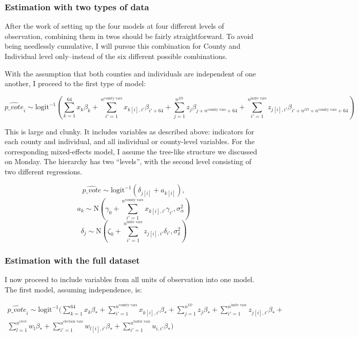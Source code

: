 \documentclass[12pt,twoside]{reedthesis}
\begin{document}
  \subsubsection{Estimation with two types of
  data}\label{estimation-with-two-types-of-data}
  
  After the work of setting up the four models at four different levels of
  observation, combining them in twos should be fairly straightforward. To
  avoid being needlessly cumulative, I will pursue this combination for
  County and Individual level only--instead of the six different possible
  combinations.
  
  With the assumption that both counties and individuals are independent
  of one another, I proceed to the first type of model:
  
  \[\hat{p\_vote}_i \sim \text{logit}^{-1}(\sum_{k = 1}^{64}x_{k}\beta_{k} + \sum_{i'=1}^{n^{\text{county vars}}}x_{k[i], i'}\beta_{i'+64} + \sum_{j = 1}^{n^{ID}}z_{j}\beta_{j + n^{\text{county vars}} + 64} + \sum_{i'=1}^{n^{\text{indiv vars}}}z_{j[i], i'}\beta_{i'+n^{ID} + n^{\text{county vars}} + 64})\]
  
  This is large and clunky. It includes variables as described above:
  indicators for each county and individual, and all individual or
  county-level variables. For the corresponding mixed-effects model, I
  assume the tree-like structure we discussed on Monday. The hierarchy has
  two ``levels'', with the second level consisting of two different
  regressions.
  
  \[\hat{p\_vote} \sim \text{logit}^{-1}(\delta_{j[i]} + a_{k[i]}), \]
  \[a_{k} \sim \text{N}(\gamma_0 + \sum_{i'=1}^{n^{\text{county vars}}}x_{k[i], i'}\gamma_{i'}, \sigma_{\alpha}^2)\]
  \[\delta_{j} \sim \text{N}(\zeta_0 + \sum_{i'=1}^{n^{\text{indiv vars}}}z_{j[i], i'}\delta_{i'}, \sigma_{\delta}^2)\]
  
  \subsubsection{Estimation with the full
  dataset}\label{estimation-with-the-full-dataset}
  
  I now proceed to include variables from all units of observation into
  one model. The first model, assuming independence, is:
  
  \[
  \begin{aligned}
  \hat{p\_vote}_i \sim \text{logit}^{-1}(\sum_{k = 1}^{64}x_{k}\beta_{*} + \sum_{i'=1}^{n^{\text{county vars}}}x_{k[i], i'}\beta_{*} + \sum_{j = 1}^{n^{ID}}z_{j}\beta_{*} + \sum_{i'=1}^{n^{\text{indiv vars}}}z_{j[i], i'}\beta_{*} + \\
  \sum_{l = 1}^{n^{elect}}w_{l}\beta_{*} + \sum_{i'=1}^{n^{\text{election vars}}}w_{l[i], i'}\beta_{*} + \sum_{i' = 1}^{n^{\text{ballot vars}}}u_{i,i'}\beta_{*})
  \end{aligned}
  \]
  
\end{document}
